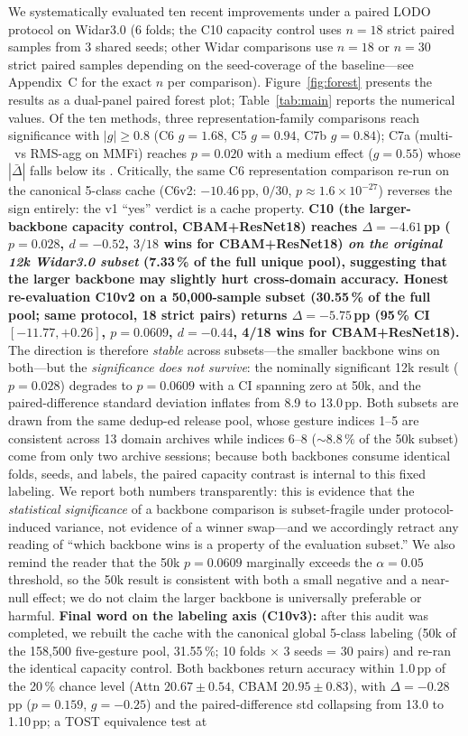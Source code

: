 \documentclass[11pt]{article}
\theoremstyle{definition}
\newcommand{\MDE}{\text{MDE}}
\newcommand{\Rx}{\text{Rx}}
\begin{document}
We systematically evaluated ten recent improvements under a paired LODO protocol on Widar3.0 (6 folds; the C10 capacity control uses $n = 18$ strict paired samples from 3 shared seeds; other Widar comparisons use $n = 18$ or $n = 30$ strict paired samples depending on the seed-coverage of the baseline---see Appendix~C for the exact $n$ per comparison). Figure~\ref{fig:forest} presents the results as a dual-panel paired forest plot; Table~\ref{tab:main} reports the numerical values. Of the ten methods, three representation-family comparisons reach significance with $|g| \geq 0.8$ (C6 $g = 1.68$, C5 $g = 0.94$, C7b $g = 0.84$); C7a (multi-\Rx\ vs RMS-agg on MMFi) reaches $p = 0.020$ with a medium effect ($g = 0.55$) whose $|\bar{\Delta}|$ falls below its \MDE. Critically, the same C6 representation comparison re-run on the canonical 5-class cache (C6v2: $-10.46$\,pp, $0/30$, $p \approx 1.6\times10^{-27}$) reverses the sign entirely: the v1 ``yes'' verdict is a cache property. \textbf{C10 (the larger-backbone capacity control, CBAM+ResNet18) reaches $\Delta = -4.61$\,pp ($p = 0.028$, $d = -0.52$, $3/18$ wins for CBAM+ResNet18) \emph{on the original 12k Widar3.0 subset} (7.33\,\% of the full unique pool), suggesting that the larger backbone may slightly hurt cross-domain accuracy. Honest re-evaluation \textbf{C10v2} on a 50{,}000-sample subset (30.55\,\% of the full pool; same protocol, 18 strict pairs) returns $\Delta = -5.75$\,pp (95\,\% CI $[-11.77, +0.26]$, $p = 0.0609$, $d = -0.44$, 4/18 wins for CBAM+ResNet18).} The direction is therefore \emph{stable} across subsets---the smaller backbone wins on both---but the \emph{significance does not survive}: the nominally significant 12k result ($p = 0.028$) degrades to $p = 0.0609$ with a CI spanning zero at 50k, and the paired-difference standard deviation inflates from 8.9 to 13.0\,pp. Both subsets are drawn from the same dedup-ed release pool, whose gesture indices 1--5 are consistent across 13 domain archives while indices 6--8 (${\sim}8.8\,\%$ of the 50k subset) come from only two archive sessions; because both backbones consume identical folds, seeds, and labels, the paired capacity contrast is internal to this fixed labeling. We report both numbers transparently: this is evidence that the \emph{statistical significance} of a backbone comparison is subset-fragile under protocol-induced variance, not evidence of a winner swap---and we accordingly retract any reading of ``which backbone wins is a property of the evaluation subset.'' We also remind the reader that the 50k $p = 0.0609$ marginally exceeds the $\alpha = 0.05$ threshold, so the 50k result is consistent with both a small negative and a near-null effect; we do not claim the larger backbone is universally preferable or harmful. \textbf{Final word on the labeling axis (C10v3):} after this audit was completed, we rebuilt the cache with the canonical global 5-class labeling (50k of the 158{,}500 five-gesture pool, 31.55\,\%; 10 folds $\times$ 3 seeds = 30 pairs) and re-ran the identical capacity control. Both backbones return accuracy within 1.0\,pp of the 20\,\% chance level (Attn $20.67 \pm 0.54$, CBAM $20.95 \pm 0.83$), with $\Delta = -0.28$\,pp ($p = 0.159$, $g = -0.25$) and the paired-difference std collapsing from 13.0 to 1.10\,pp; a TOST equivalence test at 
\end{document}
